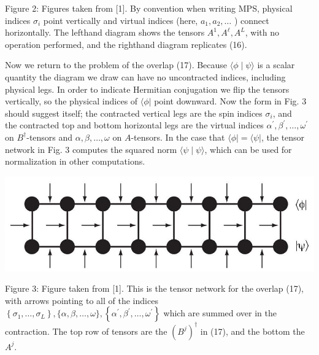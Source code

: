 \documentclass[12pt]{article}
\begin{document}
Figure 2: Figures taken from [1]. By convention when writing MPS, physical indices $\sigma_{i}$ point vertically and virtual indices (here, $a_{1}, a_{2}, \ldots$ ) connect horizontally. The lefthand diagram shows the tensors $A^{1}, A^{\ell}, A^{L}$, with no operation performed, and the righthand diagram replicates (16).

Now we return to the problem of the overlap (17). Because $\langle\phi \mid \psi\rangle$ is a scalar quantity the diagram we draw can have no uncontracted indices, including physical legs. In order to indicate Hermitian conjugation we flip the tensors vertically, so the physical indices of $\langle\phi|$ point downward. Now the form in Fig. 3 should suggest itself; the contracted vertical legs are the spin indices $\sigma_{i}$, and\\
the contracted top and bottom horizontal legs are the virtual indices $\alpha^{\prime}, \beta^{\prime}, \ldots, \omega^{\prime}$ on $B^{\dagger}$-tensors and $\alpha, \beta, \ldots, \omega$ on $A$-tensors. In the case that $\langle\phi|=\langle\psi|$, the tensor network in Fig. 3 computes the squared norm $\langle\psi \mid \psi\rangle$, which can be used for normalization in other computations.

\begin{center}
\includegraphics[max width=\textwidth]{2024_04_17_aea350b0a5e2209a42f2g-08(1)}
\end{center}

Figure 3: Figure taken from [1]. This is the tensor network for the overlap (17), with arrows pointing to all of the indices $\left\{\sigma_{1}, \ldots, \sigma_{L}\right\},\{\alpha, \beta, \ldots, \omega\},\left\{\alpha^{\prime}, \beta^{\prime}, \ldots, \omega^{\prime}\right\}$ which are summed over in the contraction. The top row of tensors are the $\left(B^{j}\right)^{\dagger}$ in (17), and the bottom the $A^{j}$.
\end{document}
